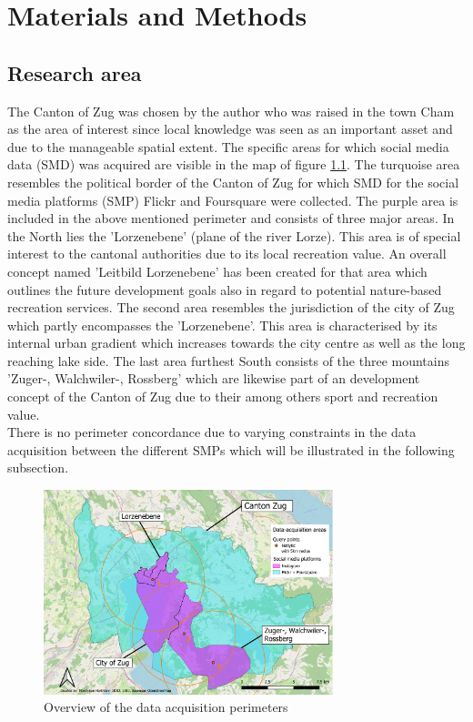 \chapter{Materials and Methods} \label{material_methods}

\section{Research area} \label{research_area}
The Canton of Zug was chosen by the author who was raised in the town Cham as the area of interest since local knowledge was seen as an important asset and due to the manageable spatial extent. The specific areas for which social media data (SMD) was acquired are visible in the map of figure \ref{fig:research_area}. The turquoise area resembles the political border of the Canton of Zug for which SMD for the social media platforms (SMP) Flickr and Foursquare were collected. The purple area is included in the above mentioned perimeter and consists of three major areas. In the North lies the 'Lorzenebene' (plane of the river Lorze). This area is of special interest to the cantonal authorities due to its local recreation value. An overall concept named 'Leitbild Lorzenebene'  \parencite{BaudirektiondesKantonsZug2012} has been created for that area which outlines the future development goals also in regard to potential nature-based recreation services. The second area resembles the jurisdiction of the city of Zug which partly encompasses the 'Lorzenebene'. This area is characterised by its internal urban gradient which increases towards the city centre as well as the long reaching lake side. The last area furthest South consists of the three mountains 'Zuger-, Walchwiler-, Rossberg' which are likewise part of an development concept \parencite{Berchtold2011} of the Canton of Zug due to their among others sport and recreation value. \\
There is no perimeter concordance due to varying constraints in the data acquisition between the different SMPs which will be illustrated in the following subsection.

\begin{figure}[h]
   \centering
   \includegraphics[width=0.75\textwidth]{img/overview_research_area_w_Lorzenebene}
   \caption{Overview of the data acquisition perimeters}
   \label{fig:research_area}
\end{figure}


